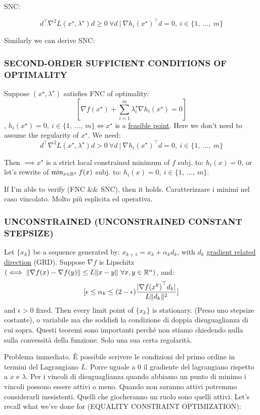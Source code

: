 SNC:

\[
	d^\top \nabla^2{L(x^\star,\lambda^\star)} d \geq 0\ \forall d\ |\ \nabla{h_i(x^\star)}^\top d = 0,\ i\in\{1,\ \dots,\ m\}
\]

Similarly we can derive SNC:

\subsubsection{SECOND-ORDER SUFFICIENT CONDITIONS OF OPTIMALITY}

Suppose $(x^\star,\lambda^\star)$ satisfies FNC of optimality:
\[
	[\nabla{f(x^\star)} + \sum_{i=1}^m{\lambda_i^\star\nabla{h_i(x^\star)}} = 0]
\]
, $h_i(x^\star) = 0,\ i\in\{1,\ \dots,\ m\} \iff x^\star$ is a \underline{feasible point}. Here we don't need to assume the regularity of $x^\star$. We need:
\[
	d^\top \nabla^2{L(x^\star,\lambda^\star)} d > 0\ \forall d\ |\ \nabla{h_i(x^\star)}^\top d = 0,\ i\in\{1,\ \dots,\ m\}
\]

Then $\implies x^\star$ is a strict local constrained minimum of $f$ subj. to: $h_i(x)=0$, or let's rewrite of $\min_{x\in\mathbb{R}^n}{f(x)}$ subj. to: $h_i(x)=0,\ i\in\{1,\ \dots,\ m\}$.

If I'm able to verify (FNC \&\& SNC), then it holds. Caratterizzare i minimi nel caso vincolato. Molto più esplicita ed operativa.

\subsubsection{UNCONSTRAINED (UNCONSTRAINED CONSTANT STEPSIZE)}

Let $\{x_k\}$ be a sequence generated by: $x_{k+1}=x_k+\alpha_kd_k$, with $d_k$ \underline{gradient related direction} (GRD). Suppose $\nabla{f}$ is Lipschitz $(\iff \lVert\nabla{f(x)}-\nabla{f(y)}\rVert \leq L\lVert x-y\rVert\ \forall x,y\in\mathbb{R}^n)$, and:
\[
	[\epsilon \leq \alpha_k \leq (2-\epsilon)\frac{\lvert\nabla{f(x^k)}^\top d_k\rvert}{L\lVert d_k\rVert^2}]
\]
and $\epsilon>0$ fixed. Then every limit point of $\{x_k\}$ is stationary. (Preso uno stepsize costante), o variabile ma che soddisfi la condizione di doppia disuguaglianza di cui sopra. Questi teoremi sono importanti perché non stiamo chiedendo nulla sulla convessità della funzione. Solo una sua certa regolarità.

Problema immediato. \`E possibile scrivere le condizioni del primo ordine in termini del Lagrangiano $L$. Porre uguale a 0 il gradiente del lagrangiano rispetto a $x$ e $\lambda$. Per i vincoli di disuguaglianza quando abbiamo un punto di minimo i vincoli possono essere attivi o meno. Quando non saranno attivi potremmo considerarli inesistenti. Quelli che giocheranno un ruolo sono quelli attivi. Let's recall what we've done for (EQUALITY CONSTRAINT OPTIMIZATION):

